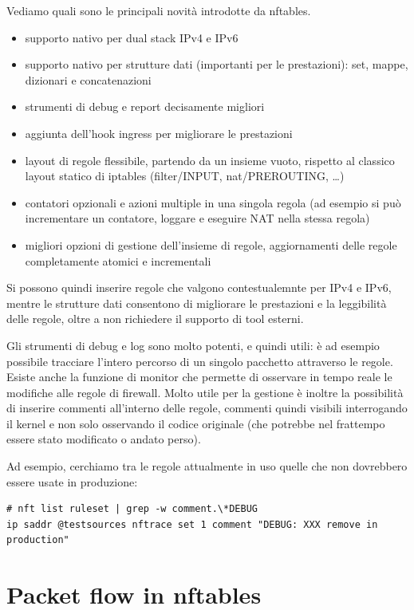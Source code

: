 Vediamo quali sono le principali novit\`a introdotte da nftables.
\begin{itemize}
    \item supporto nativo per dual stack IPv4 e IPv6
    \item supporto nativo per strutture dati (importanti per le prestazioni):
    set, mappe, dizionari e concatenazioni
    \item strumenti di debug e report decisamente migliori
    \item aggiunta dell'hook ingress per migliorare le prestazioni
    \item layout di regole flessibile, partendo da un insieme vuoto, rispetto
    al classico layout statico di iptables (filter/INPUT, nat/PREROUTING,
    \ldots)
    \item contatori opzionali e azioni multiple in una singola regola (ad
    esempio si pu\`o incrementare un contatore, loggare e eseguire NAT nella
    stessa regola)
    \item migliori opzioni di gestione dell'insieme di regole, aggiornamenti
    delle regole completamente atomici e incrementali
\end{itemize}

Si possono quindi inserire regole che valgono contestualemnte per IPv4 e IPv6,
mentre le strutture dati consentono di migliorare le prestazioni e la
leggibilit\`a delle regole, oltre a non richiedere il supporto di tool
esterni.

Gli strumenti di debug e log sono molto potenti, e quindi utili: \`e ad
esempio possibile tracciare l'intero percorso di un singolo pacchetto
attraverso le regole.  Esiste anche la funzione di monitor che permette di
osservare in tempo reale le modifiche alle regole di firewall.
Molto utile per la gestione è inoltre la possibilità di inserire commenti
all'interno delle regole, commenti quindi visibili interrogando il kernel e non
solo osservando il codice originale (che potrebbe nel frattempo essere stato 
modificato o andato perso).

Ad esempio, cerchiamo tra le regole attualmente in uso quelle che non
dovrebbero essere usate in produzione:
\begin{lstlisting}
# nft list ruleset | grep -w comment.\*DEBUG
ip saddr @testsources nftrace set 1 comment "DEBUG: XXX remove in production"
\end{lstlisting}

\section{Packet flow in nftables}

